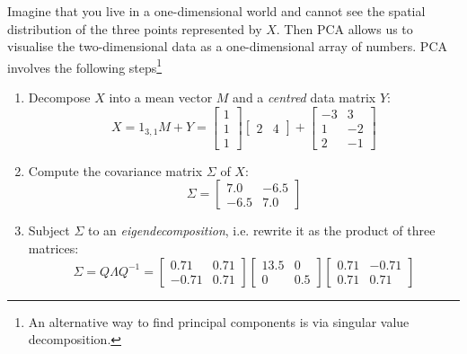 Imagine that you live in a one-dimensional world and cannot see the
spatial distribution of the three points represented by $X$. Then PCA
allows us to visualise the two-dimensional data as a one-dimensional
array of numbers. PCA involves the following steps\footnote{An
alternative way to find principal components is via singular value
decomposition.}
\begin{enumerate}
\item Decompose $X$ into a mean vector $M$ and a \emph{centred} data
  matrix $Y$:
  \begin{equation}
    X = 1_{3,1} M + Y =
    \left[
      \begin{array}{c}
        1 \\
        1 \\
        1
      \end{array}
      \right]
    \left[
      \begin{array}{cc}
        2 & 4
      \end{array}
      \right]
    +
    \left[
      \begin{array}{cc}
        -3 & 3 \\
        1 & -2 \\
        2 & -1
      \end{array}
      \right]
    \label{eq:XMY}
  \end{equation}

\item Compute the covariance matrix $\Sigma$ of $X$:
  \begin{equation}
    \Sigma =
    \left[
      \begin{array}{cc}
        7.0 & -6.5 \\
        -6.5 & 7.0
      \end{array}
      \right]
  \end{equation}

\item Subject $\Sigma$ to an
  \emph{eigendecomposition}, i.e. rewrite it as the product of three
  matrices:
  \begin{equation}
    \Sigma = Q \Lambda Q^{-1} =
    \left[
      \begin{array}{cc}
        0.71 & 0.71 \\
        -0.71 & 0.71
      \end{array}
      \right]
    \left[
      \begin{array}{cc}
        13.5 & 0 \\
        0 & 0.5
      \end{array}
      \right]
    \left[
      \begin{array}{cc}
        0.71 & -0.71 \\
        0.71 & 0.71
      \end{array}
      \right]
    \label{eq:eigen}
  \end{equation}


\end{enumerate}
